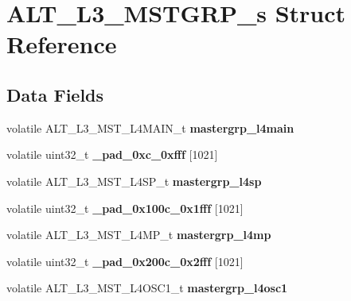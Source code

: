 \hypertarget{structALT__L3__MSTGRP__s}{}\section{A\+L\+T\+\_\+\+L3\+\_\+\+M\+S\+T\+G\+R\+P\+\_\+s Struct Reference}
\label{structALT__L3__MSTGRP__s}
\subsection*{Data Fields}
\begin{DoxyCompactItemize}
\item 
\mbox{\label{structALT__L3__MSTGRP__s_a1058506b5654303c496d8874c5c51926}} 
volatile A\+L\+T\+\_\+\+L3\+\_\+\+M\+S\+T\+\_\+\+L4\+M\+A\+I\+N\+\_\+t {\bfseries mastergrp\+\_\+l4main}
\item 
\mbox{\label{structALT__L3__MSTGRP__s_ac615659f418ed0d0a9bffa8d24351718}} 
volatile uint32\+\_\+t {\bfseries \+\_\+pad\+\_\+0xc\+\_\+0xfff} \mbox{[}1021\mbox{]}
\item 
\mbox{\label{structALT__L3__MSTGRP__s_a2b7fa7ff404e82bf20647c2ec8b0fa76}} 
volatile A\+L\+T\+\_\+\+L3\+\_\+\+M\+S\+T\+\_\+\+L4\+S\+P\+\_\+t {\bfseries mastergrp\+\_\+l4sp}
\item 
\mbox{\label{structALT__L3__MSTGRP__s_a6c7c1861809ab92d151729025aa4a9b6}} 
volatile uint32\+\_\+t {\bfseries \+\_\+pad\+\_\+0x100c\+\_\+0x1fff} \mbox{[}1021\mbox{]}
\item 
\mbox{\label{structALT__L3__MSTGRP__s_a059aac9755516bd4d5b5b00224a8dedb}} 
volatile A\+L\+T\+\_\+\+L3\+\_\+\+M\+S\+T\+\_\+\+L4\+M\+P\+\_\+t {\bfseries mastergrp\+\_\+l4mp}
\item 
\mbox{\label{structALT__L3__MSTGRP__s_af439d5264f56c763b90c9bb1dde8a504}} 
volatile uint32\+\_\+t {\bfseries \+\_\+pad\+\_\+0x200c\+\_\+0x2fff} \mbox{[}1021\mbox{]}
\item 
\mbox{\label{structALT__L3__MSTGRP__s_a8655961c76de4493cb058e3cd3af0549}} 
volatile A\+L\+T\+\_\+\+L3\+\_\+\+M\+S\+T\+\_\+\+L4\+O\+S\+C1\+\_\+t {\bfseries mastergrp\+\_\+l4osc1}

\end{DoxyCompactItemize}
